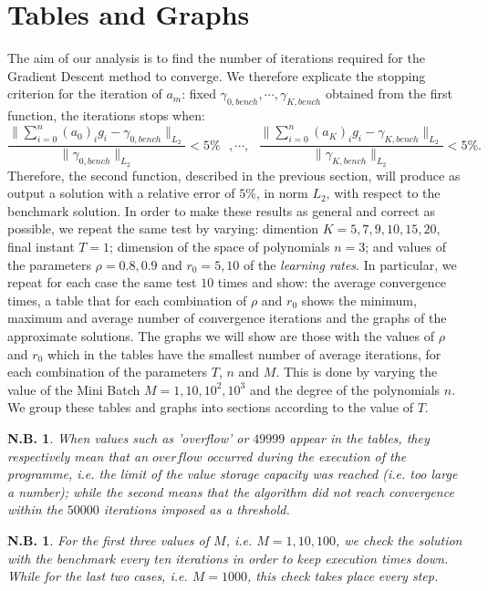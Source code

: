 \documentclass[a4paper,11pt,openright]{report}
\newtheorem{notabene}[teo]{N.B.}
\begin{document}
\section{Tables and Graphs}
The aim of our analysis is to find the number of iterations required for the Gradient Descent method to converge. We therefore explicate the stopping criterion for the iteration of $a_m$: fixed $\gamma_{0,bench}, \cdots, \gamma_{K, bench}$ obtained from the first function, the iterations stops when:
\[ 
\frac{\|\sum_{i=0}^n (a_0)_i g_i - \gamma_{0, bench} \|_{L_2}}{\| \gamma_{0, bench}\|_{L_2}} < 5\% \ \ \ , \cdots,  \ \ \ \frac{\|\sum_{i=0}^n (a_K)_i g_i - \gamma_{K, bench} \|_{L_2}}{\| \gamma_{K, bench}\|_{L_2}} < 5\%.
\]
Therefore, the second function, described in the previous section, will produce as output a solution with a relative error of $5\%$, in norm $L_2$, with respect to the benchmark solution. In order to make these results as general and correct as possible, we repeat the same test by varying: dimention $K=5, 7, 9, 10, 15, 20$, final instant $T = 1$; dimension of the space of polynomials $n = 3$; and values of the parameters $\rho = 0.8, 0.9$ and $r_0 = 5, 10$ of the \emph{learning rates}. In particular, we repeat for each case the same test $10$ times and show: the average convergence times, a table that for each combination of $\rho$ and $r_0$ shows the minimum, maximum and average number of convergence iterations and the graphs of the approximate solutions. The graphs we will show are those with the values of $\rho$ and $r_0$ which in the tables have the smallest number of average iterations, for each combination of the parameters $T$, $n$ and $M$. This is done by varying the value of the Mini Batch $M = 1, 10, 10^2, 10^3$ and the degree of the polynomials $n$. We group these tables and graphs into sections according to the value of $T$.

\begin{notabene}
When values such as 'overflow' or $49999$ appear in the tables, they respectively mean that an $overflow$ occurred during the execution of the programme, i.e. the limit of the value storage capacity was reached (i.e. too large a number); while the second means that the algorithm did not reach convergence within the $50000$ iterations imposed as a threshold.
\end{notabene}

\begin{notabene}
For the first three values of $M$, i.e. $M = 1, 10, 100$, we check the solution with the benchmark every ten iterations in order to keep execution times down. While for the last two cases, i.e. $M = 1000$, this check takes place every step.
\end{notabene}
\end{document}
